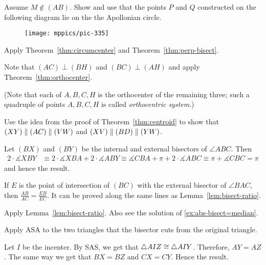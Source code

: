 Assume $M\notin(AB)$.
Show and use that the points $P$ and $Q$ constructed on the following diagram lie on the the Apollonian circle.

\begin{figure}[!ht]
\centering
\texttt{[image: mppics/pic-335]}
\end{figure}



\setcounter{eqtn}{0}

Apply Theorem~\ref{thm:circumcenter} and Theorem~\ref{thm:perp-bisect}.

Note that $(AC)\perp (BH)$ and $(BC)\perp (AH)$ and apply Theorem~\ref{thm:orthocenter}.

(Note that each of $A,B,C,H$ is the orthocenter of the remaining three; such a quadruple of points $A,B,C,H$ is called \emph{orthocentric system}.)

Use the idea from the proof of Theorem~\ref{thm:centroid}
to show that $(XY)\parallel (AC)\z\parallel (VW)$ and
$(XV)\parallel (BD)\z\parallel (YW)$.

Let $(BX)$ and $(BY)$ be the internal and external bisectors of $\angle ABC$.
Then 
\begin{align*}
2\cdot \measuredangle XBY&\equiv2\cdot \measuredangle XBA+2\cdot \measuredangle ABY\equiv
\measuredangle CBA+\pi+2\cdot \measuredangle ABC\equiv
 \pi+\measuredangle CBC=\pi
\end{align*}
and hence the result.

If $E$ is the point of intersection of $(BC)$ 
with the external bisector of $\angle BAC$, then 
$\frac{AB}{AC}=\frac{EB}{EC}$.
It can be proved along the same lines as Lemma~\ref{lem:bisect-ratio}.

Apply Lemma~\ref{lem:bisect-ratio}.
Also see the solution of \ref{ex:abs-bisect=median}.

Apply ASA to the two triangles that the bisector cuts from the original triangle. 

Let $I$ be the incenter.
By SAS, we get that $\triangle AIZ\z\cong\triangle AIY$.
Therefore, $AY=AZ$.
The same way we get that $BX=BZ$ and $CX=CY$.
Hence the result.

